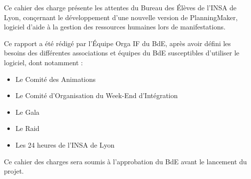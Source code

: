 Ce cahier des charge présente les attentes du Bureau des Élèves de l'INSA de Lyon, conçernant le développement d'une nouvelle version de PlanningMaker, logiciel
d'aide à la gestion des ressources humaines lors de manifestations.

Ce rapport a été rédigé par l'Équipe Orga IF du BdE, après avoir défini les besoins des différentes associations et équipes du BdE susceptibles d'utiliser le logiciel, dont notamment : 
\begin{itemize}
 \item Le Comité des Animations
\item Le Comité d'Organisation du Week-End d'Intégration
\item Le Gala
\item Le Raid
\item Les 24 heures de l'INSA de Lyon
\end{itemize}

Ce cahier des charges sera soumis à l'approbation du BdE avant le lancement du projet.